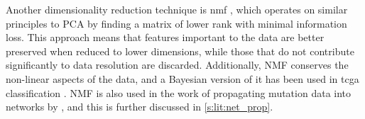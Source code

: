 Another dimensionality reduction technique is \acrfull{nmf} \citep{Lee1999-fj}, which operates on similar principles to PCA by finding a matrix of lower rank with minimal information loss. This approach means that features important to the data are better preserved when reduced to lower dimensions, while those that do not contribute significantly to data resolution are discarded. Additionally, NMF conserves the non-linear aspects of the data, and a Bayesian version of it has been used in \acrlong{tcga} classification \citep{Robertson2017-mg}. NMF is also used in the work of propagating mutation data into networks by \citet{Yang2016-dm, Cai2008-fv}, and this is further discussed in \cref{s:lit:net_prop}.

